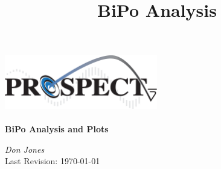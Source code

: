 \begin{titlepage}

\begin{center}

\includegraphics[width=0.50\textwidth]{figures/PROSPECT_logo}\\[1cm]    

\HRule \\[0.4cm]
{\huge \bfseries BiPo Analysis and Plots }
\HRule \\[1.5cm]
\title{BiPo Analysis}

\emph{\Large Don Jones}\\


\vfill
{\large Last Revision: \today}

\end{center}

\end{titlepage}
\newpage
